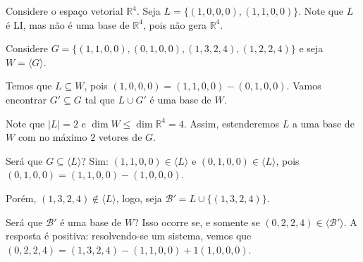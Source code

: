 \begin{example}
    Considere o espaço vetorial $\mathbb R^4$.
    Seja $L=\{(1,0,0,0), (1,1,0,0)\}$.
    Note que $L$ é LI, mas não é uma base de $\mathbb R^4$, pois não gera $\mathbb R^4$.

    Considere $G=\{(1, 1, 0, 0), (0, 1, 0, 0), (1, 3, 2, 4), (1, 2, 2, 4)\}$ e seja $W=\langle G \rangle$.

    Temos que $L\subseteq W$, pois $(1, 0, 0, 0) = (1, 1, 0, 0) - (0, 1, 0, 0)$.
    Vamos encontrar $G' \subseteq G$ tal que $L \cup G'$ é uma base de $W$.

    Note que $|L|=2$ e $\dim W \leq  \dim \mathbb R^4 = 4$.
    Assim, estenderemos $L$ a uma base de $W$ com no máximo $2$ vetores de $G$.

    Será que $G\subseteq \langle L \rangle$? Sim:
    $(1, 1, 0, 0) \in \langle L \rangle$ e $(0, 1, 0, 0) \in \langle L \rangle$, pois $(0, 1, 0, 0) = (1, 1, 0, 0) - (1, 0, 0, 0)$.

    Porém, $(1, 3, 2, 4) \notin \langle L \rangle$, logo, seja $\mathcal B'= L \cup \{(1, 3, 2, 4)\}$.

    Será que $\mathcal B'$ é uma base de $W$? Isso ocorre se, e somente se $(0, 2, 2, 4) \in \langle \mathcal B' \rangle$.
    A resposta é positiva: resolvendo-se um sistema, vemos que $(0, 2, 2, 4) = (1, 3, 2, 4) -(1, 1, 0, 0) + 1(1, 0, 0, 0)$.
\end{example}